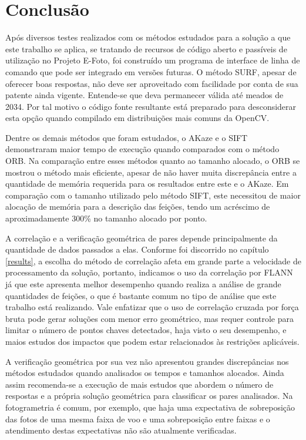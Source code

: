 \chapter*{Conclusão}

Após diversos testes realizados com os métodos estudados para a solução a que este trabalho se aplica, se tratando de recursos de código aberto e passíveis de utilização no Projeto E-Foto, foi construído um programa de interface de linha de comando que pode ser integrado em versões futuras. O método SURF, apesar de oferecer boas respostas, não deve ser aproveitado com facilidade por conta de sua patente ainda vigente. Entende-se que deva permanecer válida até meados de 2034. Por tal motivo o código fonte resultante está preparado para desconsiderar esta opção quando compilado em distribuições mais comuns da OpenCV.

Dentre os demais métodos que foram estudados, o AKaze e o SIFT demonstraram maior tempo de execução quando comparados com o método ORB. Na comparação entre esses métodos quanto ao tamanho alocado, o ORB se mostrou o método mais eficiente, apesar de não haver muita discrepância entre a quantidade de memória requerida para os resultados entre este e o AKaze. Em comparação com o tamanho utilizado pelo método SIFT, este necessitou de maior alocação de memória para a descrição das feições, tendo um acréscimo de aproximadamente 300\% no tamanho alocado por ponto.

A correlação e a verificação geométrica de pares depende principalmente da quantidade de dados passados a elas.  Conforme foi discorrido no capítulo \ref{results}, a escolha do método de correlação afeta em grande parte a velocidade de processamento da solução, portanto, indicamos o uso da correlação por FLANN já que este apresenta melhor desempenho quando realiza a análise de grande quantidades de feições, o que é bastante comum no tipo de análise que este trabalho está realizando. Vale enfatizar que o uso de correlação cruzada por força bruta pode gerar soluções com menor erro geométrico, mas requer controle para limitar o número de pontos chaves detectados, haja visto o seu desempenho, e maios estudos dos impactos que podem estar relacionados às restrições aplicáveis.

A verificação geométrica por sua vez não apresentou grandes discrepâncias nos métodos estudados quando analisados os tempos e tamanhos alocados. Ainda assim recomenda-se a execução de mais estudos que abordem o número de respostas e a própria solução geométrica para classificar os pares analisados. Na fotogrametria é comum, por exemplo, que haja uma expectativa de sobreposição das fotos de uma mesma faixa de voo e uma sobreposição entre faixas e o atendimento destas expectativas não são atualmente verificadas.

